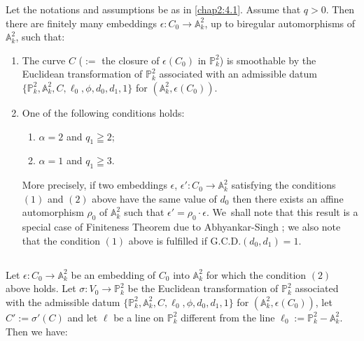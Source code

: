 \begin{theorem*}
Let the notations and assumptions be as in \ref{chap2:4.1}. Assume that
$q>0$. Then there are finitely many embeddings $\epsilon:C_{0}\to
\mathbb{A}^{2}_{k}$, up to biregular automorphisms of
$\mathbb{A}^{2}_{k}$, such that:
\begin{enumerate}
\renewcommand{\labelenumi}{\rm(\theenumi)}
\item The curve $C$ ($:=$ the closure of $\epsilon(C_{0})$ in
  $\mathbb{P}^{2}_{k}$) is smoothable by the Euclidean transformation
  of $\mathbb{P}^{2}_{k}$ associated with an admissible datum
  $\{\mathbb{P}^{2}_{k},\mathbb{A}^{2}_{k},
  C,\ell_{0},\phi,d_{0},d_{1},1\}$ for
  $(\mathbb{A}^{2}_{k},\epsilon(C_{0}))$. 

\item One of the following conditions holds:
\begin{enumerate}
\renewcommand{\theenumii}{\roman{enumii}}
\renewcommand{\labelenumii}{\rm(\theenumii)}
\item $\alpha=2$ and $q_{1}\geqq 2$; 

\item $\alpha=1$ and $q_{1}\geqq 3$.
\end{enumerate}
More precisely, if two embeddings $\epsilon$, $\epsilon':C_{0}\to
\mathbb{A}^{2}_{k}$ satisfying the conditions $(1)$ and $(2)$ above
have the same value of $d_{0}$ then there exists an affine
automorphism $\rho_{0}$ of $\mathbb{A}^{2}_{k}$ such that
$\epsilon'=\rho_{0}\cdot \epsilon$. We\pageoriginale\ shall note that
this result is a special case of Finiteness Theorem due to
Abhyankar-Singh \cite{3}; we also note that the condition $(1)$ above is
fulfilled if $\text{G.C.D.}(d_{0},d_{1})=1$.
\end{enumerate}
\end{theorem*}

\subsection{}\label{chap2:4.7}
Let $\epsilon:C_{0}\to \mathbb{A}^{2}_{k}$ be an embedding of $C_{0}$
into $\mathbb{A}^{2}_{k}$ for which the condition $(2)$ above
holds. Let $\sigma:V_{0}\to \mathbb{P}^{2}_{k}$ be the Euclidean
transformation of $\mathbb{P}^{2}_{k}$ associated with the admissible
datum
$\{\mathbb{P}^{2}_{k},\mathbb{A}^{2}_{k},C,\ell_{0},\phi,d_{0},d_{1},1\}$
for $(\mathbb{A}^{2}_{k},\epsilon(C_{0}))$, let $C':=\sigma'(C)$ and
let $\ell$ be a line on $\mathbb{P}^{2}_{k}$ different from the line
$\ell_{0}:=\mathbb{P}^{2}_{k}-\mathbb{A}^{2}_{k}$. Then we have:

